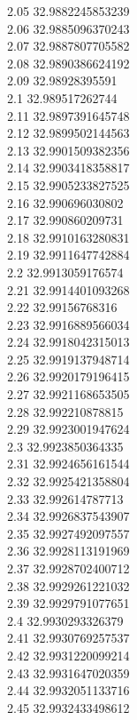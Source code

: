 {2.05	32.9882245853239\\
2.06	32.9885096370243\\
2.07	32.9887807705582\\
2.08	32.9890386624192\\
2.09	32.98928395591\\
2.1	32.989517262744\\
2.11	32.9897391645748\\
2.12	32.9899502144563\\
2.13	32.9901509382356\\
2.14	32.9903418358817\\
2.15	32.9905233827525\\
2.16	32.990696030802\\
2.17	32.990860209731\\
2.18	32.9910163280831\\
2.19	32.9911647742884\\
2.2	32.9913059176574\\
2.21	32.9914401093268\\
2.22	32.99156768316\\
2.23	32.9916889566034\\
2.24	32.9918042315013\\
2.25	32.9919137948714\\
2.26	32.9920179196415\\
2.27	32.9921168653505\\
2.28	32.992210878815\\
2.29	32.9923001947624\\
2.3	32.9923850364335\\
2.31	32.9924656161544\\
2.32	32.9925421358804\\
2.33	32.992614787713\\
2.34	32.9926837543907\\
2.35	32.9927492097557\\
2.36	32.9928113191969\\
2.37	32.9928702400712\\
2.38	32.9929261221032\\
2.39	32.9929791077651\\
2.4	32.9930293326379\\
2.41	32.9930769257537\\
2.42	32.9931220099214\\
2.43	32.9931647020359\\
2.44	32.9932051133716\\
2.45	32.9932433498612\\
}
